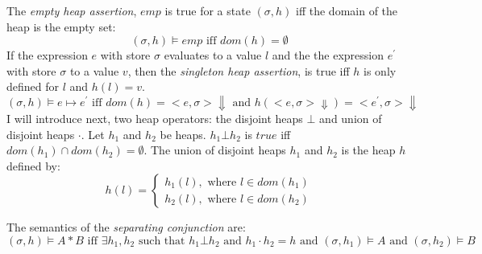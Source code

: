\documentclass[12pt]{article}
\begin{document}
The \textit{empty heap assertion}, $emp$ is true for a state $(\sigma,h)$ iff the domain of the heap is the empty set:
\[
(\sigma,h) \vDash emp \mbox{ iff } dom(h)=\emptyset
\]
If the expression $e$ with store $\sigma$ evaluates to a value $l$ and the the expression $e^\prime$ with store $\sigma$ to a value $v$, then
the \textit{singleton heap assertion}, is true iff $h$ is only defined for $l$ and $h(l)=v$.
\[
(\sigma,h) \vDash e \mapsto e^\prime \mbox{ iff } dom(h) = <e,\sigma>\Downarrow \mbox{ and } h(<e,\sigma>\Downarrow) = <e^\prime,\sigma>\Downarrow 
\]
I will introduce next, two heap operators: the disjoint heaps $\bot$ and union of disjoint heaps $\cdot$.
Let $h_1$ and $h_2$ be heaps. $h_1 \bot h_2$ is $true$ iff $dom(h_1) \cap dom(h_2) = \emptyset$. The union of disjoint heaps $h_1$ and $h_2$ is the heap $h$ defined by:
\[
h(l) = \begin{cases}
h_1(l), \mbox{ where } l \in dom(h_1)\\
h_2(l), \mbox{ where } l \in dom(h_2)
\end{cases}
\]

The semantics of the \textit{separating conjunction} are:
\[
(\sigma,h)\vDash A*B \mbox{ iff } \exists h_1, h_2 \mbox{ such that } h_1 \bot h_2 \mbox{ and } h_1 \cdot h_2 = h \mbox{ and } (\sigma, h_1) \vDash A \mbox{ and } (\sigma, h_2) \vDash B 
\]
\end{document}
